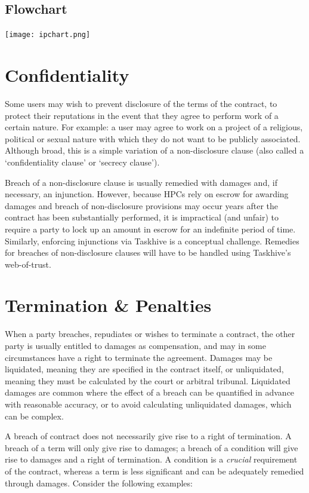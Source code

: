 \documentclass[a4paper,12pt]{article}
\begin{document}
\subsection{Flowchart}

\texttt{[image: ipchart.png]}

\section{Confidentiality}

Some users may wish to prevent disclosure of the terms of the contract, to protect their reputations in the event that they agree to perform work of a certain nature. For example: a user may agree to work on a project of a religious, political or sexual nature with which they do not want to be publicly associated. Although broad, this is a simple variation of a non-disclosure clause (also called a `confidentiality clause' or `secrecy clause').

Breach of a non-disclosure clause is usually remedied with damages and, if necessary, an injunction. However, because HPCs rely on escrow for awarding damages and breach of non-disclosure provisions may occur years after the contract has been substantially performed, it is impractical (and unfair) to require a party to lock up an amount in escrow for an indefinite period of time. Similarly, enforcing injunctions via Taskhive is a conceptual challenge. Remedies for breaches of non-disclosure clauses will have to be handled using Taskhive's web-of-trust.

\section{Termination \& Penalties}

When a party breaches, repudiates or wishes to terminate a contract, the other party is usually entitled to damages as compensation, and may in some circumstances have a right to terminate the agreement. Damages may be liquidated, meaning they are specified in the contract itself, or unliquidated, meaning they must be calculated by the court or arbitral tribunal. Liquidated damages are common where the effect of a breach can be quantified in advance with reasonable accuracy, or to avoid calculating unliquidated damages, which can be complex.

A breach of contract does not necessarily give rise to a right of termination. A breach of a term will only give rise to damages; a breach of a condition will give rise to damages and a right of termination. A condition is a \textit{crucial} requirement of the contract, whereas a term is less significant and can be adequately remedied through damages. Consider the following examples:
\end{document}
